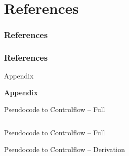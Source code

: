 \documentclass[usenames,dvipsnames]{beamer}
\begin{document}
	\section{References}
	\begin{frame}
		\frametitle{References}
	\end{frame}
	
	\begin{frame}
		\frametitle{References}
		\tiny
		
		
	\end{frame}

	\appendix
	
	\begin{frame}{Appendix}
		\begin{center}
			{\LARGE \textbf{Appendix}}
		\end{center}
	\end{frame}

	\begin{frame}{Pseudocode to Controlflow -- Full}
		\begin{columns}
			\column{\dimexpr\paperwidth-20pt}
			
		\end{columns}
	\end{frame}

	\begin{frame}{Pseudocode to Controlflow -- Full}
		
	\end{frame}

	\begin{frame}{Pseudocode to Controlflow -- Derivation}
		\begin{columns}
			\column{\dimexpr\paperwidth-30pt}
			
		\end{columns}
	\end{frame}
\end{document}

